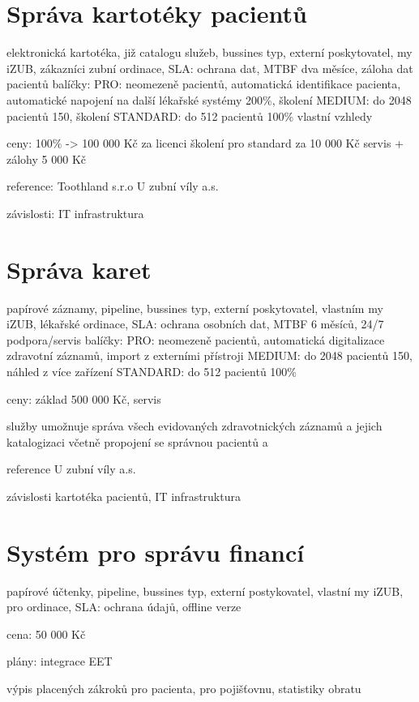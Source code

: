 \documentclass[12pt, a4paper, titlepage]{article}
\begin{document}
	

	\section{Správa kartotéky pacientů}
	elektronická kartotéka, již catalogu služeb, bussines typ, externí poskytovatel,
	my iZUB, zákazníci zubní ordinace, 
	SLA:
		ochrana dat, MTBF dva měsíce, záloha dat pacientů
	balíčky:
		PRO: neomezeně pacientů, automatická identifikace pacienta, automatické napojení na další lékařské systémy 200\%, školení
		MEDIUM: do 2048 pacientů 150, školení
		STANDARD: do 512 pacientů 100\%
		vlastní vzhledy

	ceny:
		100\% -> 100 000 Kč za licenci
		školení pro standard za 10 000 Kč
		servis + zálohy 5 000 Kč

	reference:
		Toothland s.r.o
		U zubní víly a.s.

	závislosti:
		IT infrastruktura


	\section{Správa karet}
	papírové záznamy, pipeline, bussines typ, externí poskytovatel, vlastním my iZUB, lékařské ordinace,
	SLA:
		ochrana osobních dat, MTBF 6 měsíců, 24/7 podpora/servis
	balíčky:
		PRO: neomezeně pacientů, automatická digitalizace zdravotní záznamů, import z externími přístroji 
		MEDIUM: do 2048 pacientů 150, náhled z více zařízení
		STANDARD: do 512 pacientů 100\%

	ceny:
		základ 500 000 Kč,
		servis 

	služby umožnuje správa všech evidovaných zdravotnických záznamů a jejich katalogizaci včetně propojení se správnou pacientů a 

	reference
		U zubní víly a.s.

	závislosti
		kartotéka pacientů, IT infrastruktura

	\section{Systém pro správu financí}
	papírové účtenky, pipeline, bussines typ, externí postykovatel, vlastní my iZUB, pro ordinace,
	SLA:
		ochrana údajů, offline verze

	cena:
		50 000 Kč

	plány:
		integrace EET

	výpis placených zákroků pro pacienta, pro pojišťovnu, statistiky obratu
\end{document}
